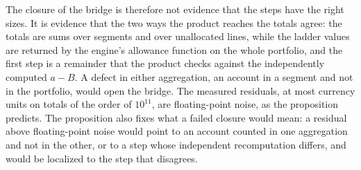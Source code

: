 The closure of the bridge is therefore not evidence that the steps have the right sizes.
It is evidence that the two ways the product reaches the totals agree: the totals are sums over segments and over unallocated lines, while the ladder values are returned by the engine's allowance function on the whole portfolio, and the first step is a remainder that the product checks against the independently computed $a-B$.
A defect in either aggregation, an account in a segment and not in the portfolio, would open the bridge.
The measured residuals, at most \efiveBridgeMax{} currency units on totals of the order of $10^{11}$, are floating-point noise, as the proposition predicts.
The proposition also fixes what a failed closure would mean: a residual above floating-point noise would point to an account counted in one aggregation and not in the other, or to a step whose independent recomputation differs, and would be localized to the step that disagrees.

